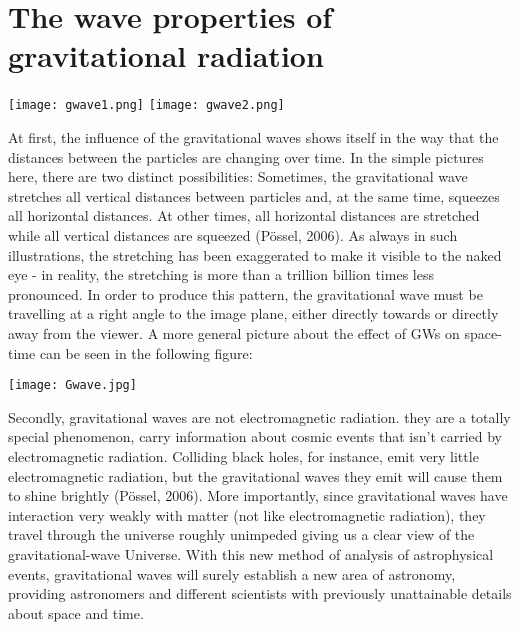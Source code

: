 \documentclass[11]{article}
\begin{document}
\section{The wave properties of gravitational radiation}

\begin{center}
\texttt{[image: gwave1.png]}
\texttt{[image: gwave2.png]}
\end{center}
At first, the influence of the gravitational waves shows itself in the way that the distances between the particles are changing over time. In the simple pictures here, there are two distinct possibilities: Sometimes, the gravitational wave stretches all vertical distances between particles and, at the same time, squeezes all horizontal distances. At other times, all horizontal distances are stretched while all vertical distances are squeezed (Pössel, 2006). As always in such illustrations, the stretching has been exaggerated to make it visible to the naked eye - in reality, the stretching is more than a trillion billion times less pronounced. In order to produce this pattern, the gravitational wave must be travelling at a right angle to the image plane, either directly towards or directly away from the viewer.
A more general picture about the effect of GWs on space-time can be seen in the following figure:
\begin{center}
\texttt{[image: Gwave.jpg]}
\end{center}

\vspace{5mm}
Secondly, gravitational waves are not electromagnetic radiation. they are a totally special phenomenon, carry information about cosmic events that isn't carried by electromagnetic radiation. Colliding black holes, for instance, emit very little electromagnetic radiation, but the gravitational waves they emit will cause them to shine brightly (Pössel, 2006). More importantly, since gravitational waves have interaction very weakly with matter (not like electromagnetic radiation), they travel through the universe roughly unimpeded giving us a clear view of the gravitational-wave Universe. With this new method of analysis of astrophysical events, gravitational waves will surely establish a new area of astronomy, providing astronomers and different scientists with previously unattainable details about space and time.
\end{document}
